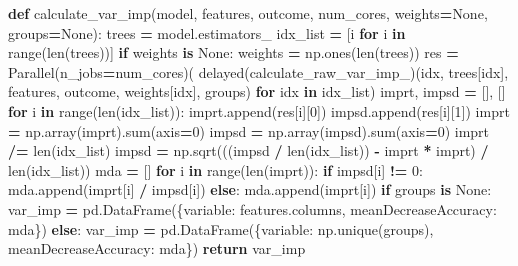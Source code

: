 \documentclass[
  11pt,
  oneside]{book}
\newenvironment{Shaded}{\begin{snugshade}}{\end{snugshade}}
\newcommand{\BuiltInTok}[1]{#1}
\newcommand{\ControlFlowTok}[1]{\textcolor[rgb]{0.13,0.29,0.53}{\textbf{#1}}}
\newcommand{\DecValTok}[1]{\textcolor[rgb]{0.00,0.00,0.81}{#1}}
\newcommand{\KeywordTok}[1]{\textcolor[rgb]{0.13,0.29,0.53}{\textbf{#1}}}
\newcommand{\NormalTok}[1]{#1}
\newcommand{\OperatorTok}[1]{\textcolor[rgb]{0.81,0.36,0.00}{\textbf{#1}}}
\newcommand{\StringTok}[1]{\textcolor[rgb]{0.31,0.60,0.02}{#1}}
\newcommand{\VariableTok}[1]{\textcolor[rgb]{0.00,0.00,0.00}{#1}}
\begin{document}
\begin{Shaded}
\begin{Highlighting}[]
\KeywordTok{def}\NormalTok{ calculate\_var\_imp(model, features, outcome, num\_cores, weights}\OperatorTok{=}\VariableTok{None}\NormalTok{, groups}\OperatorTok{=}\VariableTok{None}\NormalTok{):}
\NormalTok{    trees }\OperatorTok{=}\NormalTok{ model.estimators\_}
\NormalTok{    idx\_list }\OperatorTok{=}\NormalTok{ [i }\ControlFlowTok{for}\NormalTok{ i }\KeywordTok{in} \BuiltInTok{range}\NormalTok{(}\BuiltInTok{len}\NormalTok{(trees))]}
    \ControlFlowTok{if}\NormalTok{ weights }\KeywordTok{is} \VariableTok{None}\NormalTok{:}
\NormalTok{        weights }\OperatorTok{=}\NormalTok{ np.ones(}\BuiltInTok{len}\NormalTok{(trees))}
\NormalTok{    res }\OperatorTok{=}\NormalTok{ Parallel(n\_jobs}\OperatorTok{=}\NormalTok{num\_cores)(}
\NormalTok{      delayed(calculate\_raw\_var\_imp\_)(idx, trees[idx], features, outcome, weights[idx], groups) }\ControlFlowTok{for}\NormalTok{ idx }\KeywordTok{in}\NormalTok{ idx\_list)}
\NormalTok{    imprt, impsd }\OperatorTok{=}\NormalTok{ [], []}
    \ControlFlowTok{for}\NormalTok{ i }\KeywordTok{in} \BuiltInTok{range}\NormalTok{(}\BuiltInTok{len}\NormalTok{(idx\_list)):}
\NormalTok{        imprt.append(res[i][}\DecValTok{0}\NormalTok{])}
\NormalTok{        impsd.append(res[i][}\DecValTok{1}\NormalTok{])}
\NormalTok{    imprt }\OperatorTok{=}\NormalTok{ np.array(imprt).}\BuiltInTok{sum}\NormalTok{(axis}\OperatorTok{=}\DecValTok{0}\NormalTok{)}
\NormalTok{    impsd }\OperatorTok{=}\NormalTok{ np.array(impsd).}\BuiltInTok{sum}\NormalTok{(axis}\OperatorTok{=}\DecValTok{0}\NormalTok{)}
\NormalTok{    imprt }\OperatorTok{/=} \BuiltInTok{len}\NormalTok{(idx\_list)}
\NormalTok{    impsd }\OperatorTok{=}\NormalTok{ np.sqrt(((impsd }\OperatorTok{/} \BuiltInTok{len}\NormalTok{(idx\_list)) }\OperatorTok{{-}}\NormalTok{ imprt }\OperatorTok{*}\NormalTok{ imprt) }\OperatorTok{/} \BuiltInTok{len}\NormalTok{(idx\_list))}
\NormalTok{    mda }\OperatorTok{=}\NormalTok{ []}
    \ControlFlowTok{for}\NormalTok{ i }\KeywordTok{in} \BuiltInTok{range}\NormalTok{(}\BuiltInTok{len}\NormalTok{(imprt)):}
        \ControlFlowTok{if}\NormalTok{ impsd[i] }\OperatorTok{!=} \DecValTok{0}\NormalTok{:}
\NormalTok{            mda.append(imprt[i] }\OperatorTok{/}\NormalTok{ impsd[i])}
        \ControlFlowTok{else}\NormalTok{:}
\NormalTok{            mda.append(imprt[i])}
    \ControlFlowTok{if}\NormalTok{ groups }\KeywordTok{is} \VariableTok{None}\NormalTok{:}
\NormalTok{        var\_imp }\OperatorTok{=}\NormalTok{ pd.DataFrame(\{}\StringTok{\textquotesingle{}variable\textquotesingle{}}\NormalTok{: features.columns, }\StringTok{\textquotesingle{}meanDecreaseAccuracy\textquotesingle{}}\NormalTok{: mda\})}
    \ControlFlowTok{else}\NormalTok{: }
\NormalTok{        var\_imp }\OperatorTok{=}\NormalTok{ pd.DataFrame(\{}\StringTok{\textquotesingle{}variable\textquotesingle{}}\NormalTok{: np.unique(groups), }\StringTok{\textquotesingle{}meanDecreaseAccuracy\textquotesingle{}}\NormalTok{: mda\})}
    \ControlFlowTok{return}\NormalTok{ var\_imp}
\end{Highlighting}
\end{Shaded}
\end{document}
